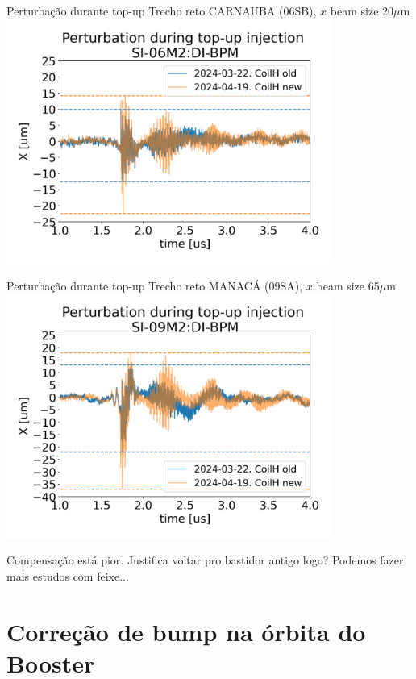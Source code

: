 \documentclass[1611]{beamer}            %
\begin{document}
\begin{frame}{Perturbação durante top-up}
    Trecho reto CARNAUBA (06SB), $x$ beam size 20$\mu$m
    \centering
    \includegraphics[width=0.8\textwidth]{2024-05-10/figures/injection_perturbSI-06M2:DI-BPM.png}
\end{frame}

\begin{frame}{Perturbação durante top-up}
    Trecho reto MANACÁ (09SA), $x$ beam size 65$\mu$m
    \centering
    \includegraphics[width=0.8\textwidth]{2024-05-10/figures/injection_perturbSI-09M2:DI-BPM.png}

    Compensação está pior. Justifica voltar pro bastidor antigo logo? Podemos fazer mais estudos com feixe...
\end{frame}



\section{Correção de bump na órbita do Booster}
\end{document}
